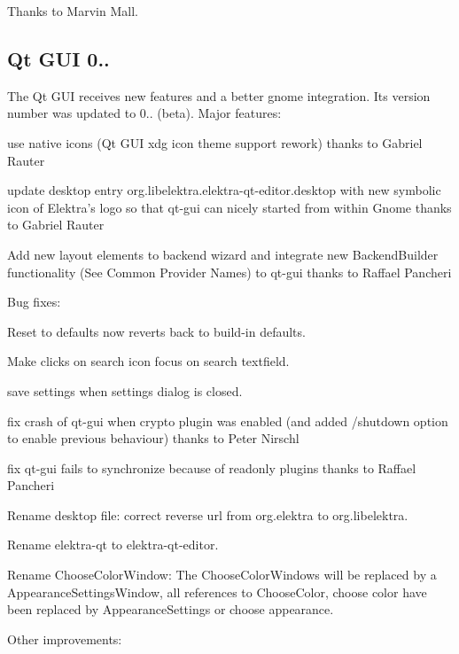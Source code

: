 Thanks to Marvin Mall.

\subsection*{Qt G\+U\+I 0..}

The Qt G\+U\+I receives new features and a better gnome integration. Its version number was updated to 0.. (beta). Major features\+:


\begin{DoxyItemize}
\item use native icons (Qt G\+U\+I xdg icon theme support rework) thanks to Gabriel Rauter
\item update desktop entry org.\+libelektra.\+elektra-\/qt-\/editor.\+desktop with new symbolic icon of Elektra's logo so that qt-\/gui can nicely started from within Gnome thanks to Gabriel Rauter
\item Add new layout elements to backend wizard and integrate new Backend\+Builder functionality (See Common Provider Names) to qt-\/gui thanks to Raffael Pancheri
\end{DoxyItemize}

Bug fixes\+:


\begin{DoxyItemize}
\item Reset to defaults now reverts back to build-\/in defaults.
\item Make clicks on search icon focus on search textfield.
\item save settings when settings dialog is closed.
\item fix crash of qt-\/gui when crypto plugin was enabled (and added /shutdown option to enable previous behaviour) thanks to Peter Nirschl
\item fix qt-\/gui fails to synchronize because of readonly plugins thanks to Raffael Pancheri
\item Rename desktop file\+: correct reverse url from org.\+elektra to org.\+libelektra.
\item Rename elektra-\/qt to elektra-\/qt-\/editor.
\item Rename Choose\+Color\+Window\+: The Choose\+Color\+Windows will be replaced by a Appearance\+Settings\+Window, all references to Choose\+Color, choose color have been replaced by Appearance\+Settings or choose appearance.
\end{DoxyItemize}

Other improvements\+:


